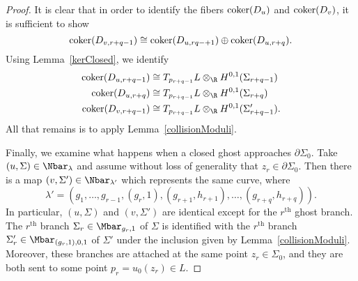 \begin{proposition}
\begin{proof}
It is clear that in order to identify the fibers $\operatorname{coker}(D_u)$ and $\operatorname{coker}(D_v)$, it is sufficient to show
\[
\operatorname{coker}(D_{v,r+q-1}) \cong \operatorname{coker}(D_{u,rq-+1}) \oplus \operatorname{coker}(D_{u,r+q}).
\]
Using Lemma~\ref{kerClosed}, we identify 
\begin{align*}
\coker(D_{u,r+q-1}) & \cong T_{p_{r+q-1}}L \otimes_\R H^{0,1}(\Sigma_{r+q-1})
\\
\coker(D_{u,r+q}) & \cong T_{p_{r+q-1}}L \otimes_\R H^{0,1}(\Sigma_{r+q})
\\
\coker(D_{v,r+q-1}) & \cong T_{p_{r+q-1}}L \otimes_\R H^{0,1}(\Sigma_{r+q-1}')
.
\end{align*}
All that remains is to apply Lemma~\ref{collisionModuli}.

Finally, we examine what happens when a closed ghost approaches $\partial\Sigma_0$. Take $(u,\Sigma) \in \Nbar_\lambda$ and assume without loss of generality that $z_r \in \partial\Sigma_0$. Then there is a map $(v,\Sigma') \in \Nbar_{\lambda'}$  which represents the same curve, where
\[
\lambda'=(g_1,\ldots,g_{r-1},(g_r,1),(g_{r+1},h_{r+1}),\ldots,(g_{r+q},h_{r+q})).
\]
In particular, $(u,\Sigma)$ and $(v,\Sigma')$ are identical except for the $r^{\text{th}}$ ghost branch. The $r^{\text{th}}$ branch $\Sigma_r \in \Mbar_{g_r,1}$ of $\Sigma$ is identified with the $r^{\text{th}}$ branch $\Sigma_r' \in \Mbar_{(g_r,1),0,1}$ of $\Sigma'$ under the inclusion given by Lemma~\ref{collisionModuli}. Moreover, these branches are attached at the same point $z_r \in \Sigma_0$, and they are both sent to some point $p_r=u_0(z_r) \in L$.


\end{proof}
\end{proposition}

